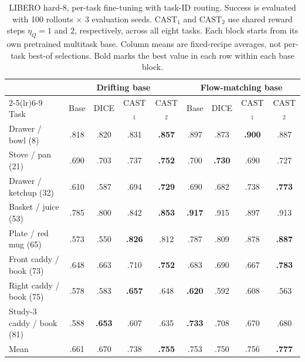 \begin{table}[t]
\centering
\caption{LIBERO hard-8, per-task fine-tuning with task-ID routing. Success
is evaluated with 100 rollouts $\times$ 3 evaluation seeds. CAST$_1$ and
CAST$_2$ use shared reward steps $\eta_Q=1$ and $2$, respectively, across
all eight tasks. Each block starts from its own pretrained multitask base.
Column means are fixed-recipe averages, not per-task best-of selections.
Bold marks the best value in each row within each base block.}
\label{tab:libero-main}
\small
\begin{tabular*}{\textwidth}{@{\extracolsep{\fill}}lcccccccc@{}}
\toprule
 & \multicolumn{4}{c}{Drifting base} & \multicolumn{4}{c}{Flow-matching base} \\
\cmidrule(lr){2-5}\cmidrule(lr){6-9}
Task & Base & DICE & CAST$_1$ & CAST$_2$ & Base & DICE & CAST$_1$ & CAST$_2$ \\
\midrule
Drawer / bowl (8) & .818 & .820 & .831 & \textbf{.857} & .897 & .873 & \textbf{.900} & .887 \\
Stove / pan (21) & .690 & .703 & .737 & \textbf{.752} & .700 & \textbf{.730} & .690 & .727 \\
Drawer / ketchup (32) & .610 & .587 & .694 & \textbf{.729} & .690 & .682 & .738 & \textbf{.773} \\
Basket / juice (53) & .785 & .800 & .842 & \textbf{.853} & \textbf{.917} & .915 & .897 & .913 \\
Plate / red mug (65) & .573 & .550 & \textbf{.826} & .812 & .787 & .809 & .878 & \textbf{.887} \\
Front caddy / book (73) & .648 & .663 & .710 & \textbf{.752} & .683 & .690 & .667 & \textbf{.783} \\
Right caddy / book (75) & .578 & .583 & \textbf{.657} & .648 & \textbf{.620} & .592 & .608 & .563 \\
Study-3 caddy / book (81) & .588 & \textbf{.653} & .607 & .635 & \textbf{.733} & .708 & .670 & .680 \\
\midrule
Mean & .661 & .670 & .738 & \textbf{.755} & .753 & .750 & .756 & \textbf{.777} \\
\bottomrule
\end{tabular*}
\end{table}
